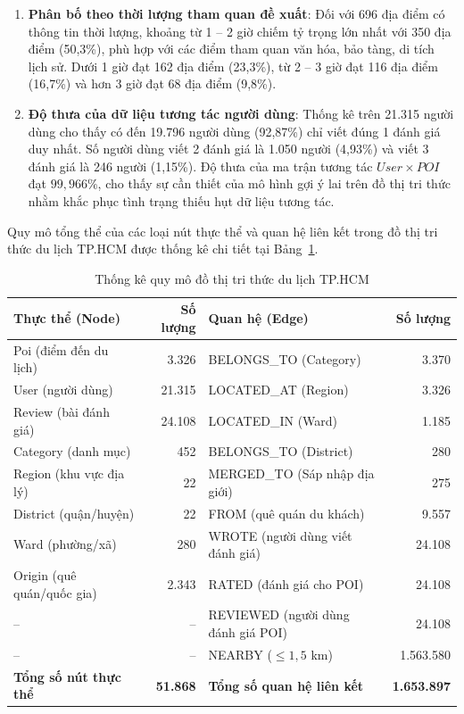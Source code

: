 \documentclass[journal,onecolumn,10pt]{IEEEtran}
\begin{document}
\begin{enumerate}
    \item \textbf{Phân bố theo thời lượng tham quan đề xuất}: Đối với 696 địa điểm có thông tin thời lượng, khoảng từ 1 -- 2 giờ chiếm tỷ trọng lớn nhất với 350 địa điểm (50,3\%), phù hợp với các điểm tham quan văn hóa, bảo tàng, di tích lịch sử. Dưới 1 giờ đạt 162 địa điểm (23,3\%), từ 2 -- 3 giờ đạt 116 địa điểm (16,7\%) và hơn 3 giờ đạt 68 địa điểm (9,8\%).
    
    \item \textbf{Độ thưa của dữ liệu tương tác người dùng}: Thống kê trên 21.315 người dùng cho thấy có đến 19.796 người dùng (92,87\%) chỉ viết đúng 1 đánh giá duy nhất. Số người dùng viết 2 đánh giá là 1.050 người (4,93\%) và viết 3 đánh giá là 246 người (1,15\%). Độ thưa của ma trận tương tác $User \times POI$ đạt $99,966\%$, cho thấy sự cần thiết của mô hình gợi ý lai trên đồ thị tri thức nhằm khắc phục tình trạng thiếu hụt dữ liệu tương tác.
\end{enumerate}

Quy mô tổng thể của các loại nút thực thể và quan hệ liên kết trong đồ thị tri thức du lịch TP.HCM được thống kê chi tiết tại Bảng~\ref{tab:kgstats}.

\begin{table}[H]
\centering
\caption{Thống kê quy mô đồ thị tri thức du lịch TP.HCM}
\label{tab:kgstats}
\small
\setlength{\tabcolsep}{6pt}
\begin{tabular}{lrlr}
\toprule
\textbf{Thực thể (Node)} & \textbf{Số lượng} & \textbf{Quan hệ (Edge)} & \textbf{Số lượng} \\
\midrule
Poi (điểm đến du lịch) & 3.326 & BELONGS\_TO (Category) & 3.370 \\
User (người dùng) & 21.315 & LOCATED\_AT (Region) & 3.326 \\
Review (bài đánh giá) & 24.108 & LOCATED\_IN (Ward) & 1.185 \\
Category (danh mục) & 452 & BELONGS\_TO (District) & 280 \\
Region (khu vực địa lý) & 22 & MERGED\_TO (Sáp nhập địa giới) & 275 \\
District (quận/huyện) & 22 & FROM (quê quán du khách) & 9.557 \\
Ward (phường/xã) & 280 & WROTE (người dùng viết đánh giá) & 24.108 \\
Origin (quê quán/quốc gia) & 2.343 & RATED (đánh giá cho POI) & 24.108 \\
-- & -- & REVIEWED (người dùng đánh giá POI) & 24.108 \\
-- & -- & NEARBY ($\le 1,5$ km) & 1.563.580 \\
\midrule
\textbf{Tổng số nút thực thể} & \textbf{51.868} & \textbf{Tổng số quan hệ liên kết} & \textbf{1.653.897} \\
\bottomrule
\end{tabular}
\end{table}
\end{document}
